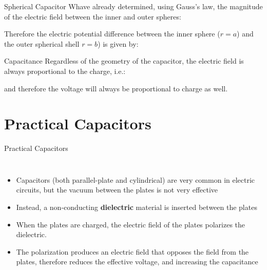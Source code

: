\documentclass[12pt,aspectratio=169]{beamer}
\begin{document}
\begin{frame}{Spherical Capacitor}
  Whave already determined, using Gauss's law, the magnitude of the electric
  field between the inner and outer spheres:
  

  Therefore the electric potential difference between the inner sphere ($r=a$)
  and the outer spherical shell $r=b$) is given by:

\end{frame}



\begin{frame}{Capacitance}
  Regardless of the geometry of the capacitor, the electric field is always
  proportional to the charge, i.e.:


  and therefore the voltage will always be proportional to charge as well.
\end{frame}



\section{Practical Capacitors}

\begin{frame}{Practical Capacitors}
  \begin{columns}

    \begin{itemize}
    \item Capacitors (both parallel-plate and cylindrical) are very common in
      electric circuits, but the vacuum between the plates is not very effective
    \item Instead, a non-conducting \textbf{dielectric} material is inserted
      between the plates
    \item When the plates are charged, the electric field of the plates
      polarizes the dielectric.
    \item The polarization  produces an electric field that opposes the field
      from the plates, therefore reduces the effective voltage, and increasing
      the capacitance
    \end{itemize}
  \end{columns}
\end{frame}
\end{document}
